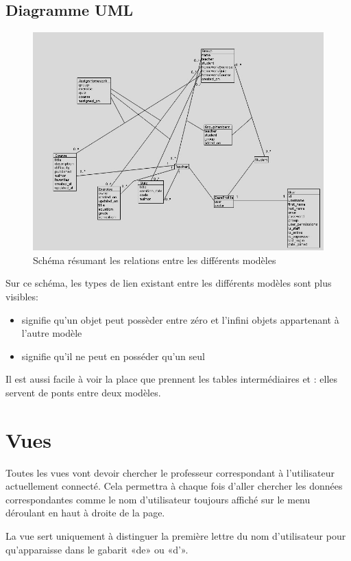 \documentclass[a4paper,10pt,french]{sphinxmanual}
\begin{document}
\subsection{Diagramme UML}
\label{documentation:diagramme-uml}\begin{figure}[htbp]
\centering
\capstart

\includegraphics[width=0.600\linewidth]{UML.jpg}
\caption{Schéma résumant les relations entre les différents modèles}\end{figure}

Sur ce schéma, les types de lien existant entre les différents modèles sont plus
visibles:
\begin{itemize}
\item {} 
 signifie qu'un objet peut possèder entre zéro et l'infini objets
appartenant à l'autre modèle

\item {} 
 signifie qu'il ne peut en posséder qu'un seul

\end{itemize}

Il est aussi facile à voir la place que prennent les tables intermédiaires
 et : elles servent de ponts entre deux
modèles.


\section{Vues}
\label{documentation:vues}
Toutes les vues vont devoir chercher le professeur correspondant à
l'utilisateur actuellement connecté. Cela permettra à chaque fois d'aller
chercher les données correspondantes comme le nom d'utilisateur toujours
affiché sur le menu déroulant en haut à droite de la page.

La vue  sert uniquement à distinguer la première lettre du nom
d'utilisateur pour qu'apparaisse dans le gabarit «de» ou «d'».
\end{document}
